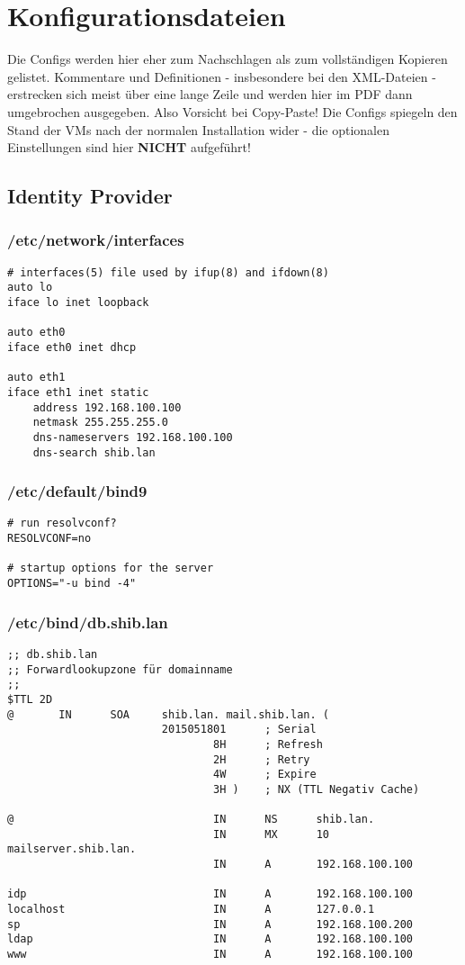 \section{Konfigurationsdateien}
Die Configs werden hier eher zum Nachschlagen als zum vollständigen Kopieren
gelistet. Kommentare und Definitionen - insbesondere bei den XML-Dateien -
erstrecken sich meist über eine lange Zeile und werden hier im PDF dann
umgebrochen ausgegeben. Also Vorsicht bei Copy-Paste! Die Configs spiegeln den
Stand der VMs nach der normalen Installation wider - die optionalen
Einstellungen sind hier \textbf{NICHT} aufgeführt!
\subsection{Identity Provider}
\subsubsection{/etc/network/interfaces}
\begin{lstlisting}
# interfaces(5) file used by ifup(8) and ifdown(8)
auto lo
iface lo inet loopback

auto eth0
iface eth0 inet dhcp

auto eth1
iface eth1 inet static
	address 192.168.100.100
	netmask 255.255.255.0
	dns-nameservers 192.168.100.100
	dns-search shib.lan
\end{lstlisting}
\subsubsection{/etc/default/bind9}
\begin{lstlisting}
# run resolvconf?
RESOLVCONF=no

# startup options for the server
OPTIONS="-u bind -4"
\end{lstlisting}

\subsubsection{/etc/bind/db.shib.lan}
\begin{lstlisting}
;; db.shib.lan
;; Forwardlookupzone für domainname
;;
$TTL 2D
@       IN      SOA     shib.lan. mail.shib.lan. (
                        2015051801      ; Serial
                                8H      ; Refresh
                                2H      ; Retry
                                4W      ; Expire
                                3H )    ; NX (TTL Negativ Cache)

@                               IN      NS      shib.lan.
                                IN      MX      10 mailserver.shib.lan.
                                IN      A       192.168.100.100

idp                             IN      A       192.168.100.100
localhost                       IN      A       127.0.0.1
sp                              IN      A       192.168.100.200
ldap                            IN      A       192.168.100.100
www                             IN      A       192.168.100.100

\end{lstlisting}


